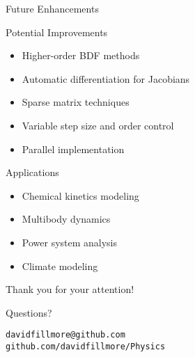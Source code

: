 \documentclass[10pt]{beamer}
\begin{document}
\begin{frame}{Future Enhancements}
\begin{block}{Potential Improvements}
\begin{itemize}
\item Higher-order BDF methods
\item Automatic differentiation for Jacobians
\item Sparse matrix techniques
\item Variable step size and order control
\item Parallel implementation
\end{itemize}
\end{block}

\begin{block}{Applications}
\begin{itemize}
\item Chemical kinetics modeling
\item Multibody dynamics
\item Power system analysis
\item Climate modeling
\end{itemize}
\end{block}
\end{frame}

\begin{frame}
\centering
\Large Thank you for your attention!

\vspace{1cm}

Questions?

\vspace{1cm}

\normalsize
\texttt{davidfillmore@github.com} \\
\texttt{github.com/davidfillmore/Physics}
\end{frame}
\end{document}
